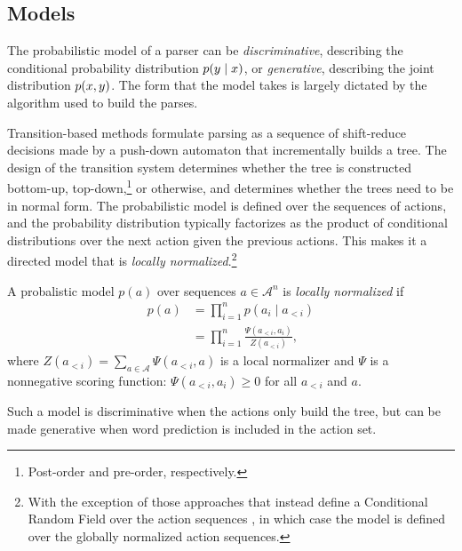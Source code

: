   \subsection{Models}
    The probabilistic model of a parser can be \textit{discriminative}, describing the conditional probability distribution $p(y \mid x)$, or \textit{generative}, describing the joint distribution $p(x, y)$. The form that the model takes is largely dictated by the algorithm used to build the parses.

    Transition-based methods formulate parsing as a sequence of shift-reduce decisions made by a push-down automaton that incrementally builds a tree. The design of the transition system determines whether the tree is constructed bottom-up, top-down,\footnote{Post-order and pre-order, respectively.} or otherwise, and determines whether the trees need to be in normal form. The probabilistic model is defined over the sequences of actions, and the probability distribution typically factorizes as the product of conditional distributions over the next action given the previous actions. This makes it a directed model that is \textit{locally normalized}.\footnote{With the exception of those approaches that instead define a Conditional Random Field over the action sequences \citep{andor2016globally}, in which case the model is defined over the globally normalized action sequences.}
    \begin{definition}{}
      A probalistic model $p(a)$ over sequences $a \in \mathcal{A}^n$ is \textit{locally normalized} if
      \begin{align*}
        p(a)
          &= \prod_{i=1}^{n} p(a_i \mid a_{<i})  \\
          &= \prod_{i=1}^{n} \frac{ \Psi( a_{<i}, a_{i} ) }{ Z( a_{<i} ) },
      \end{align*}
      where $Z( a_{<i} ) = \sum_{a \in \mathcal{A}} \Psi( a_{<i}, a )$  is a local normalizer and $\Psi$ is a nonnegative scoring function: $\Psi( a_{<i}, a_{i} ) \geq 0$ for all $a_{<i}$ and $a$.
    \end{definition}
    Such a model is discriminative when the actions only build the tree, but can be made generative when word prediction is included in the action set.

